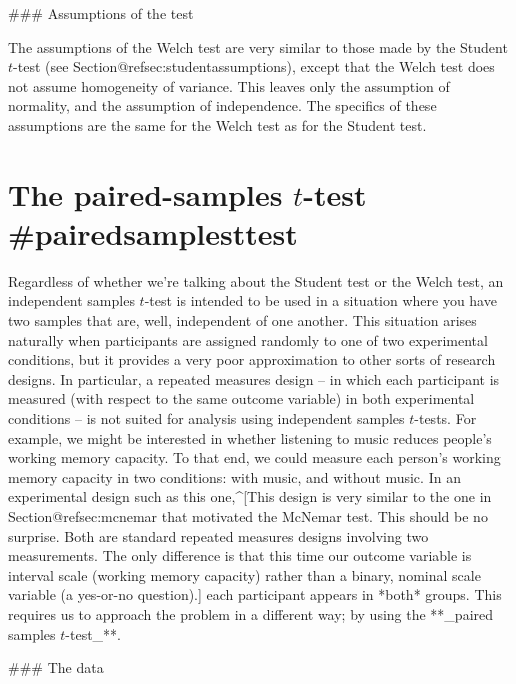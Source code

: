 ### Assumptions of the test

The assumptions of the Welch test are very similar to those made by the Student $t$-test (see Section@refsec:studentassumptions), except that the Welch test does not assume homogeneity of variance. This leaves only the assumption of normality, and the assumption of independence. The specifics of these assumptions are the same for the Welch test as for the Student test. 

\vspace*{12pt}



\section{The paired-samples $t$-test {#pairedsamplesttest}}

Regardless of whether we're talking about the Student test or the Welch test, an independent samples $t$-test is intended to be used in a situation where you have two samples that are, well, independent of one another. This situation arises naturally when participants are assigned randomly to one of two experimental conditions, but it provides a very poor approximation to other sorts of research designs. In particular, a repeated measures design -- in which each participant is measured (with respect to the same outcome variable) in both experimental conditions -- is not suited for analysis using independent samples $t$-tests. For example, we might be interested in whether listening to music reduces people's working memory capacity. To that end, we could measure each person's working memory capacity in two conditions: with music, and without music. In an experimental design such as this one,^[This design is very similar to the one in Section@refsec:mcnemar that motivated the McNemar test. This should be no surprise. Both are standard repeated measures designs involving two measurements. The only difference is that this time our outcome variable is interval scale (working memory capacity) rather than a binary, nominal scale variable (a yes-or-no question).] each participant appears in *both* groups. This requires us to approach the problem in a different way; by using the **_paired samples $t$-test_**. 

### The data


